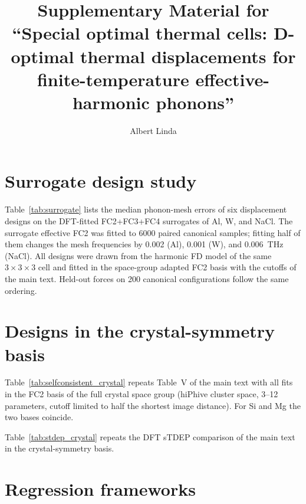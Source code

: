 \documentclass[aip,jap,reprint,amsmath,amssymb,floatfix]{revtex4-2}
\begin{document}
\title{Supplementary Material for ``Special optimal thermal cells: D-optimal
thermal displacements for finite-temperature effective-harmonic phonons''}

\author{Albert Linda}

\maketitle

\section{Surrogate design study}

Table~\ref{tab:surrogate} lists the median phonon-mesh errors of six
displacement designs on the DFT-fitted FC2+FC3+FC4 surrogates of Al, W, and
NaCl. The surrogate effective FC2 was fitted to 6000 paired canonical
samples; fitting half of them changes the mesh frequencies by 0.002 (Al),
0.001 (W), and 0.006~THz (NaCl). All designs were drawn from the harmonic FD
model of the same $3\times3\times3$ cell and fitted in the space-group adapted
FC2 basis with the cutoffs of the main text. Held-out forces on 200 canonical
configurations follow the same ordering.



\section{Designs in the crystal-symmetry basis}

Table~\ref{tab:selfconsistent_crystal} repeats Table~V of the main text with
all fits in the FC2 basis of the full crystal space group (hiPhive cluster
space, 3--12 parameters, cutoff limited to half the shortest image distance).
For Si and Mg the two bases coincide.



Table~\ref{tab:stdep_crystal} repeats the DFT sTDEP comparison of the main
text in the crystal-symmetry basis.



\section{Regression frameworks}
\end{document}
